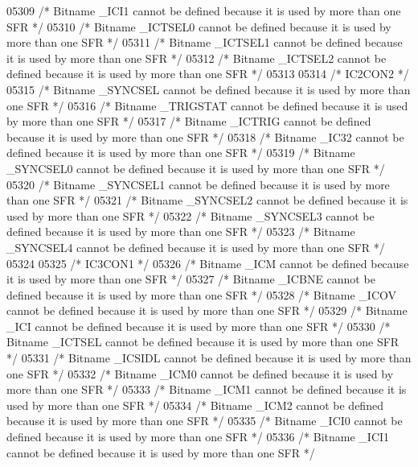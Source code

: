 \begin{DoxyCode}
05309 \textcolor{comment}{/* Bitname \_ICI1 cannot be defined because it is used by more than one SFR */}
05310 \textcolor{comment}{/* Bitname \_ICTSEL0 cannot be defined because it is used by more than one SFR */}
05311 \textcolor{comment}{/* Bitname \_ICTSEL1 cannot be defined because it is used by more than one SFR */}
05312 \textcolor{comment}{/* Bitname \_ICTSEL2 cannot be defined because it is used by more than one SFR */}
05313 
05314 \textcolor{comment}{/* IC2CON2 */}
05315 \textcolor{comment}{/* Bitname \_SYNCSEL cannot be defined because it is used by more than one SFR */}
05316 \textcolor{comment}{/* Bitname \_TRIGSTAT cannot be defined because it is used by more than one SFR */}
05317 \textcolor{comment}{/* Bitname \_ICTRIG cannot be defined because it is used by more than one SFR */}
05318 \textcolor{comment}{/* Bitname \_IC32 cannot be defined because it is used by more than one SFR */}
05319 \textcolor{comment}{/* Bitname \_SYNCSEL0 cannot be defined because it is used by more than one SFR */}
05320 \textcolor{comment}{/* Bitname \_SYNCSEL1 cannot be defined because it is used by more than one SFR */}
05321 \textcolor{comment}{/* Bitname \_SYNCSEL2 cannot be defined because it is used by more than one SFR */}
05322 \textcolor{comment}{/* Bitname \_SYNCSEL3 cannot be defined because it is used by more than one SFR */}
05323 \textcolor{comment}{/* Bitname \_SYNCSEL4 cannot be defined because it is used by more than one SFR */}
05324 
05325 \textcolor{comment}{/* IC3CON1 */}
05326 \textcolor{comment}{/* Bitname \_ICM cannot be defined because it is used by more than one SFR */}
05327 \textcolor{comment}{/* Bitname \_ICBNE cannot be defined because it is used by more than one SFR */}
05328 \textcolor{comment}{/* Bitname \_ICOV cannot be defined because it is used by more than one SFR */}
05329 \textcolor{comment}{/* Bitname \_ICI cannot be defined because it is used by more than one SFR */}
05330 \textcolor{comment}{/* Bitname \_ICTSEL cannot be defined because it is used by more than one SFR */}
05331 \textcolor{comment}{/* Bitname \_ICSIDL cannot be defined because it is used by more than one SFR */}
05332 \textcolor{comment}{/* Bitname \_ICM0 cannot be defined because it is used by more than one SFR */}
05333 \textcolor{comment}{/* Bitname \_ICM1 cannot be defined because it is used by more than one SFR */}
05334 \textcolor{comment}{/* Bitname \_ICM2 cannot be defined because it is used by more than one SFR */}
05335 \textcolor{comment}{/* Bitname \_ICI0 cannot be defined because it is used by more than one SFR */}
05336 \textcolor{comment}{/* Bitname \_ICI1 cannot be defined because it is used by more than one SFR */}

\end{DoxyCode}

